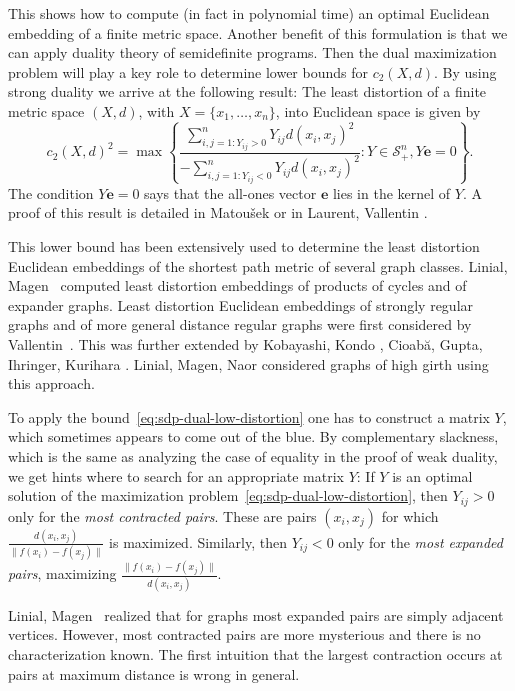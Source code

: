 \documentclass{amsart}
\begin{document}
This shows how to compute (in fact in polynomial time) an optimal Euclidean
embedding of a finite metric space. Another benefit of this
formulation is that we can apply duality theory of semidefinite
programs. Then the dual maximization problem will play a key role to
determine lower bounds for $c_2(X,d)$.  By using strong duality we
arrive at the following result: The least distortion of a finite
metric space $(X,d)$, with $X = \{x_1, \ldots, x_n\}$, into Euclidean
space is given by
\begin{equation}
  \label{eq:sdp-dual-low-distortion}
  c_2(X,d)^2 = \max \left\{
\frac{\sum_{i,j=1 : Y_{ij} > 0}^n Y_{ij} d(x_i,x_j)^2}{-\sum_{i,j=1 :
    Y_{ij} < 0}^n Y_{ij} d(x_i,x_j)^2} :
Y \in \mathcal{S}^n_+, Y\mathbf{e} = 0
\right\}.
\end{equation}
The condition $Y\mathbf{e} = 0$ says that the all-ones vector
$\mathbf{e}$ lies in the kernel of $Y$. A proof of this result is
detailed in Matou\v{s}ek \cite{Matousek2002} or in Laurent, Vallentin \cite{LaurentV}.

This lower bound has been extensively used to determine the least
distortion Euclidean embeddings of the shortest path metric of several
graph classes. Linial, Magen~\cite{LinialM2000} computed least
distortion embeddings of products of cycles and of expander graphs.
Least distortion Euclidean embeddings of strongly regular graphs and
of more general distance regular graphs were first considered by
Vallentin~\cite{Vallentin2008b}. This was further extended by
Kobayashi, Kondo \cite{KobayashiK2015}, Cioab\u{a}, Gupta, Ihringer,
Kurihara \cite{CioabaGIK2021}. Linial, Magen, Naor
\cite{LinialMN2002} considered graphs of high girth using this
approach.

To apply the bound~\eqref{eq:sdp-dual-low-distortion} one has to
construct a matrix $Y$, which sometimes appears to come out of the
blue. By complementary slackness, which is the same as analyzing the
case of equality in the proof of weak duality, we get hints where to
search for an appropriate matrix $Y$: If $Y$ is an optimal solution of the maximization
problem~\eqref{eq:sdp-dual-low-distortion}, then $Y_{ij} > 0$ only for
the \emph{most contracted pairs}. These are pairs $(x_i, x_j)$ for
which $\frac{d(x_i,x_j)}{\|f(x_i) - f(x_j)\|}$ is
maximized. Similarly, then $Y_{ij} < 0$ only for the \emph{most
  expanded pairs}, maximizing
$\frac{\|f(x_i) - f(x_j)\|}{d(x_i,x_j)}$.

Linial, Magen~\cite{LinialM2000} realized that for graphs most
expanded pairs are simply adjacent vertices. However, most contracted
pairs are more mysterious and there is no characterization known. The
first intuition that the largest contraction occurs at pairs at maximum
distance is wrong in general.
\end{document}
